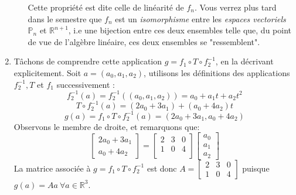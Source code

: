 \documentclass{article}
\newcommand{\R}{\mathbb{R}}
\newcommand{\Pn}{\mathbb{P}}
\begin{document}
\begin{enumerate}
\begin{enumerate}
        \noindent Cette propriété est dite celle de linéarité de $f_n$. Vous verrez plus tard dans le semestre que $f_n$ est un \textit{isomorphisme} entre les \textit{espaces vectoriels} $\Pn_n$ et $\R^{n+1}$, i.e une bijection entre ces deux ensembles telle que, du point de vue de l'algèbre linéaire, ces deux ensembles se "ressemblent".
    \end{enumerate}
    \item
    Tâchons de comprendre cette application $g = f_1 \circ T \circ f_2^{-1}$, en la décrivant explicitement. Soit $a = (a_0, a_1, a_2)$, utilisons les définitions des applications $f_2^{-1}, T$ et $f_1$ successivement :
    $$
    f_2^{-1}(a)= f_2^{-1}((a_0,a_1,a_2)) = a_0 + a_1t+ a_2t^2
    $$
    $$
    T\circ f_2^{-1}(a) = (2a_0 + 3a_1)+(a_0 + 4a_2)t
    $$
    $$
    g(a) = f_1 \circ T\circ f_2^{-1}(a) = (2a_0 + 3a_1, a_0 + 4a_2)
    $$
    Observons le membre de droite, et remarquons que:
    $$\begin{bmatrix} 2a_0 + 3a_1 \\ a_0 + 4a_2\end{bmatrix} = 
    \begin{bmatrix} 2 & 3 & 0 \\ 1 & 0 & 4 \\ \end{bmatrix} \begin{bmatrix} a_0 \\ a_1 \\ a_2\end{bmatrix}$$
    La matrice associée à $g = f_1 \circ T\circ f_2^{-1}$ est donc $A = \begin{bmatrix} 2 & 3 & 0 \\ 1 & 0 & 4 \end{bmatrix}$ puisque $g(a) = Aa \ \forall a \in \R^3$.\\
    

\end{enumerate}
\end{document}
